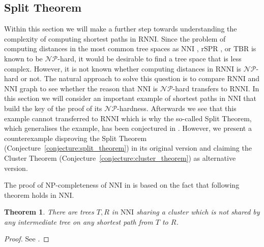 \documentclass{amsart}
\newcommand{\np}{\mathcal{NP}}
\newcommand{\nni}{\mathrm{NNI}}
\newcommand{\rnni}{\mathrm{RNNI}}
\newcommand{\tbr}{\mathrm{TBR}}
\newcommand{\rspr}{\mathrm{rSPR}}
\newtheorem{theorem}[definition]{Theorem}
\begin{document}
\subsection{Split Theorem}
\label{section:split_theorem}

Within this section we will make a further step towards understanding the complexity of computing shortest paths in $\rnni$.
Since the problem of computing distances in the most common tree spaces as $\nni$ \autocite{jiang2000}, $\rspr$ \autocite{Bordewich2005}, or $\tbr$ \autocite{allen2001subtree} is known to be $\np$-hard, it would be desirable to find a tree space that is less complex.
However, it is not known whether computing distances in $\rnni$ is $\np$-hard or not.
The natural approach to solve this question is to compare $\rnni$ and $\nni$ graph to see whether the reason that $\nni$ is $\np$-hard transfers to $\rnni$.
In this section we will consider an important example of shortest paths in $\nni$ that build the key of the proof of its $\np$-hardness.
Afterwards we see that this example cannot transferred to $\rnni$ which is why the so-called Split Theorem, which generalises the example, has been conjectured in \autocite{Gavryushkin2017}.
However, we present a counterexample disproving the Split Theorem (Conjecture~\ref{conjecture:split_theorem}) in its original version and claiming the Cluster Theorem (Conjecture~\ref{conjecture:cluster_theorem}) as alternative version.

The proof of NP-completeness of $\nni$ in \autocite{jiang2000} is based on the fact that following theorem holds in $\nni$.

\begin{theorem}
	There are trees $T,R$ in $\nni$ sharing a cluster which is not shared by any intermediate tree on any shortest path from $T$ to $R$.
	\label{thm:split_nni}
\end{theorem}

\begin{proof}
	See \autocite{Li1996}.
\end{proof}
\end{document}
